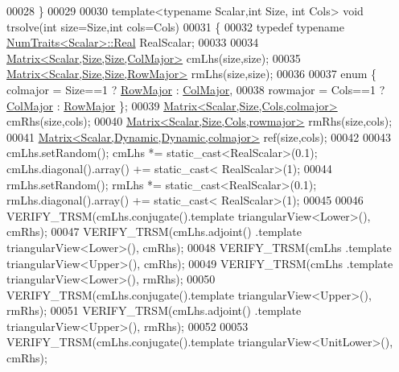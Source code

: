 \begin{DoxyCode}
00028 \textcolor{preprocessor}{  \}}
00029 
00030 \textcolor{keyword}{template}<\textcolor{keyword}{typename} Scalar,\textcolor{keywordtype}{int} Size, \textcolor{keywordtype}{int} Cols> \textcolor{keywordtype}{void} trsolve(\textcolor{keywordtype}{int} size=Size,\textcolor{keywordtype}{int} cols=Cols)
00031 \{
00032   \textcolor{keyword}{typedef} \textcolor{keyword}{typename} \hyperlink{group___core___module_struct_eigen_1_1_num_traits}{NumTraits<Scalar>::Real} RealScalar;
00033 
00034   \hyperlink{group___core___module_class_eigen_1_1_matrix}{Matrix<Scalar,Size,Size,ColMajor>} cmLhs(size,size);
00035   \hyperlink{group___core___module_class_eigen_1_1_matrix}{Matrix<Scalar,Size,Size,RowMajor>} rmLhs(size,size);
00036 
00037   \textcolor{keyword}{enum} \{  colmajor = Size==1 ? \hyperlink{group__enums_ggaacded1a18ae58b0f554751f6cdf9eb13acfcde9cd8677c5f7caf6bd603666aae3}{RowMajor} : \hyperlink{group__enums_ggaacded1a18ae58b0f554751f6cdf9eb13a0cbd4bdd0abcfc0224c5fcb5e4f6669a}{ColMajor},
00038           rowmajor = Cols==1 ? \hyperlink{group__enums_ggaacded1a18ae58b0f554751f6cdf9eb13a0cbd4bdd0abcfc0224c5fcb5e4f6669a}{ColMajor} : \hyperlink{group__enums_ggaacded1a18ae58b0f554751f6cdf9eb13acfcde9cd8677c5f7caf6bd603666aae3}{RowMajor} \};
00039   \hyperlink{group___core___module_class_eigen_1_1_matrix}{Matrix<Scalar,Size,Cols,colmajor>} cmRhs(size,cols);
00040   \hyperlink{group___core___module_class_eigen_1_1_matrix}{Matrix<Scalar,Size,Cols,rowmajor>} rmRhs(size,cols);
00041   \hyperlink{group___core___module_class_eigen_1_1_matrix}{Matrix<Scalar,Dynamic,Dynamic,colmajor>} ref(size,cols);
00042 
00043   cmLhs.setRandom(); cmLhs *= \textcolor{keyword}{static\_cast<}RealScalar\textcolor{keyword}{>}(0.1); cmLhs.diagonal().array() += \textcolor{keyword}{static\_cast<}
      RealScalar\textcolor{keyword}{>}(1);
00044   rmLhs.setRandom(); rmLhs *= \textcolor{keyword}{static\_cast<}RealScalar\textcolor{keyword}{>}(0.1); rmLhs.diagonal().array() += \textcolor{keyword}{static\_cast<}
      RealScalar\textcolor{keyword}{>}(1);
00045 
00046   VERIFY\_TRSM(cmLhs.conjugate().template triangularView<Lower>(), cmRhs);
00047   VERIFY\_TRSM(cmLhs.adjoint()  .template triangularView<Lower>(), cmRhs);
00048   VERIFY\_TRSM(cmLhs            .\textcolor{keyword}{template} triangularView<Upper>(), cmRhs);
00049   VERIFY\_TRSM(cmLhs            .\textcolor{keyword}{template} triangularView<Lower>(), rmRhs);
00050   VERIFY\_TRSM(cmLhs.conjugate().template triangularView<Upper>(), rmRhs);
00051   VERIFY\_TRSM(cmLhs.adjoint()  .template triangularView<Upper>(), rmRhs);
00052 
00053   VERIFY\_TRSM(cmLhs.conjugate().template triangularView<UnitLower>(), cmRhs);

\end{DoxyCode}
